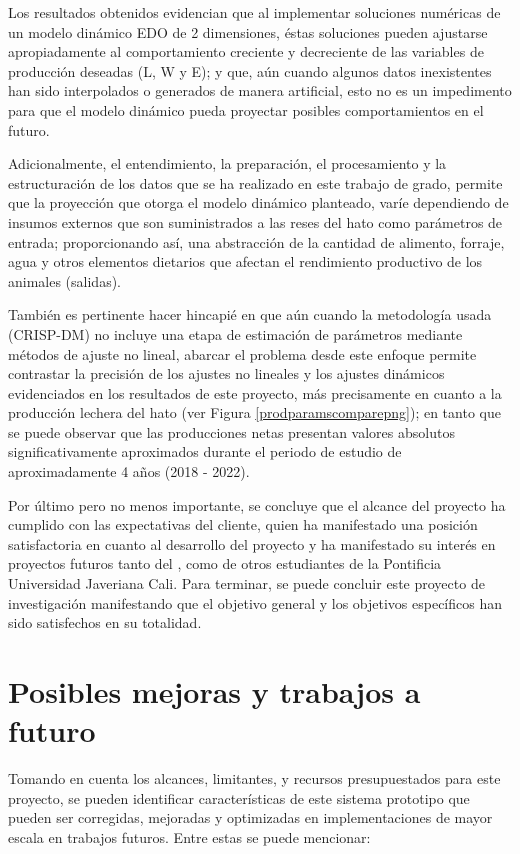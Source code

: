 Los resultados obtenidos evidencian que al implementar soluciones numéricas de un modelo dinámico EDO de 2 dimensiones, éstas soluciones pueden ajustarse apropiadamente al comportamiento creciente y decreciente de las variables de producción deseadas (L, W y E); y que, aún cuando algunos datos inexistentes han sido interpolados o generados de manera artificial, esto no es un impedimento para que el modelo dinámico pueda proyectar posibles comportamientos en el futuro.

Adicionalmente, el entendimiento, la preparación, el procesamiento y la estructuración de los datos que se ha realizado en este trabajo de grado, permite que la proyección que otorga el modelo dinámico planteado, varíe dependiendo de insumos externos que son suministrados a las reses del hato como parámetros de entrada; proporcionando así, una abstracción de la cantidad de alimento, forraje, agua y otros elementos dietarios que afectan el rendimiento productivo de los animales (salidas).

También es pertinente hacer hincapié en que aún cuando la metodología usada (CRISP-DM) no incluye una etapa de estimación de parámetros mediante métodos de ajuste no lineal, abarcar el problema desde este enfoque permite contrastar la precisión de los ajustes no lineales y los ajustes dinámicos evidenciados en los resultados de este proyecto, más precisamente en cuanto a la producción lechera del hato (ver Figura \ref{prodparamscomparepng}); en tanto que se puede observar que las producciones netas presentan valores absolutos significativamente aproximados durante el periodo de estudio de aproximadamente 4 años (2018 - 2022).

Por último pero no menos importante, se concluye que el alcance del proyecto ha cumplido con las expectativas del cliente, quien ha manifestado una posición satisfactoria en cuanto al desarrollo del proyecto y ha manifestado su interés en proyectos futuros tanto del \authorA, como de otros estudiantes de la Pontificia Universidad Javeriana Cali. Para terminar, se puede concluir este proyecto de investigación manifestando que el objetivo general y los objetivos específicos han sido satisfechos en su totalidad.

\section{Posibles mejoras y trabajos a futuro}

Tomando en cuenta los alcances, limitantes, y recursos presupuestados para este proyecto, se pueden identificar características de este sistema prototipo que pueden ser corregidas, mejoradas y optimizadas en implementaciones de mayor escala en trabajos futuros. Entre estas se puede mencionar:

